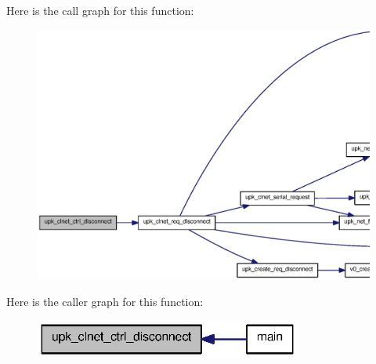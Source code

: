Here is the call graph for this function:
\nopagebreak
\begin{figure}[H]
\begin{center}
\leavevmode
\includegraphics[width=340pt]{upk__client__net_8c_a8d7e372cd6428f266cfb371189a291c9_cgraph}
\end{center}
\end{figure}




Here is the caller graph for this function:\nopagebreak
\begin{figure}[H]
\begin{center}
\leavevmode
\includegraphics[width=248pt]{upk__client__net_8c_a8d7e372cd6428f266cfb371189a291c9_icgraph}
\end{center}
\end{figure}



